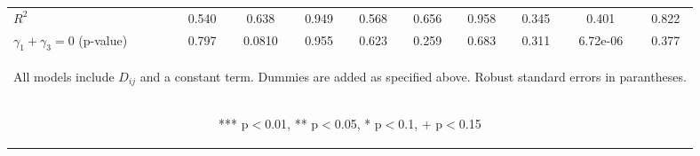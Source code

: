 \begin{center}
\begin{tabular}{lccccccccc}
$R^2$ & 0.540 & 0.638 & 0.949 & 0.568 & 0.656 & 0.958 & 0.345 & 0.401 & 0.822 \\
 $\gamma_1+\gamma_3 =0$ (p-value) & 0.797 & 0.0810 & 0.955 & 0.623 & 0.259 & 0.683 & 0.311 & 6.72e-06 & 0.377 \\ \hline
\multicolumn{10}{c}{\begin{footnotesize} All models include $ D_{ij}$ and a constant term. Dummies are added as specified above. Robust standard errors in parantheses.\end{footnotesize}} \\
\multicolumn{10}{c}{\begin{footnotesize} *** p$<$0.01, ** p$<$0.05, * p$<$0.1, + p$<$0.15\end{footnotesize}} \\
\end{tabular}
\end{center}
